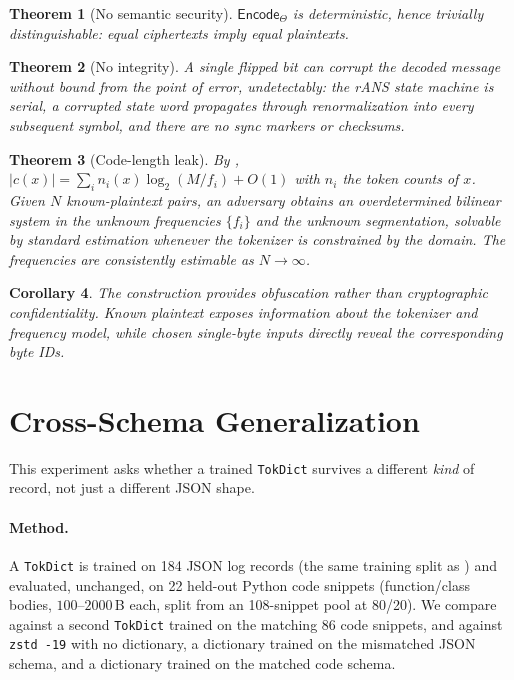 \documentclass[10pt,twocolumn]{article}
\theoremstyle{plain}
\newtheorem{theorem}{Theorem}[section]
\newtheorem{corollary}[theorem]{Corollary}
\theoremstyle{definition}
\begin{document}
\begin{theorem}[No semantic security]\label{thm:det}
$\mathsf{Encode}_\Theta$ is deterministic, hence trivially distinguishable: equal
ciphertexts imply equal plaintexts.
\end{theorem}

\begin{theorem}[No integrity]\label{thm:mal}
A single flipped bit can corrupt the decoded message without bound from the point of
error, undetectably: the rANS state machine is serial, a corrupted state word
propagates through renormalization into every subsequent symbol, and there are no
sync markers or checksums.
\end{theorem}

\begin{theorem}[Code-length leak]\label{thm:kpa}
By , $|c(x)| = \sum_i n_i(x)\log_2(M/f_i) + O(1)$ with $n_i$ the
token counts of $x$. Given $N$ known-plaintext pairs, an adversary obtains an
overdetermined bilinear system in the unknown frequencies $\{f_i\}$ and the unknown
segmentation, solvable by standard estimation whenever the tokenizer is constrained
by the domain. The frequencies are consistently estimable as $N \to \infty$.
\end{theorem}

\begin{corollary}\label{cor:obfuscation}
The construction provides obfuscation rather than cryptographic confidentiality.
Known plaintext exposes information about the tokenizer and frequency model, while
chosen single-byte inputs directly reveal the corresponding byte IDs.
\end{corollary}


\section{Cross-Schema Generalization}\label{sec:generalization}

This experiment asks whether a trained \texttt{TokDict} survives a different
\emph{kind} of record, not just a different JSON shape.

\paragraph{Method.} A \texttt{TokDict} is trained on 184 JSON log records (the same
training split as ) and evaluated, unchanged, on 22 held-out Python
code snippets (function/class bodies, $100$--$2000$\,B each, split from an 108-snippet
pool at 80/20). We compare against a second \texttt{TokDict} trained on the matching
86 code snippets, and against \texttt{zstd -19} with no dictionary, a dictionary
trained on the mismatched JSON schema, and a dictionary trained on the matched code
schema.
\end{document}
